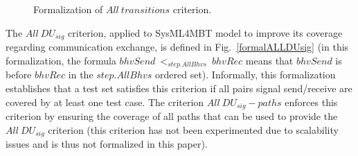 \documentclass{llncs}
\begin{document}
\begin{figure}[htp]
\begin{center}
\begin{scriptsize}
\end{scriptsize}
\vspace*{-.2cm}
\caption{Formalization of $All~transitions$ criterion.}
\label{formaltrans}
\end{center}
\vspace*{-.8cm}
\end{figure}
The $All~DU_{sig}$ criterion, applied to SysML4MBT model to improve its coverage
regarding communication exchange, is defined in Fig.~\ref{formalALLDUsig}
(in this formalization, the formula $bhvSend~<_{step.AllBhvs}~bhvRec$
means that $bhvSend$ is before $bhvRec$ in the $step.AllBhvs$ ordered
set). Informally, this formalization establishes that a test set satisfies
this criterion if all pairs signal send/receive are covered by at least
one test case. The criterion $All~DU_{sig}-paths$ enforces this
criterion by ensuring the coverage of all paths that can be
used to provide the $All~DU_{sig}$ criterion (this criterion has not
been experimented due to scalability issues and is thus not formalized
in this paper).
\end{document}
